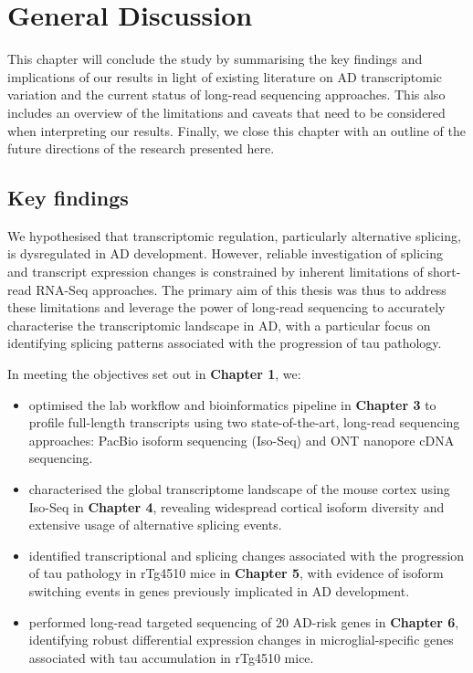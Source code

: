 \chapter{General Discussion}

This chapter will conclude the study by summarising the key findings and implications of our results in light of existing literature on AD transcriptomic variation and the current status of long-read sequencing approaches. This also includes an overview of the limitations and caveats that need to be considered when interpreting our results. Finally, we close this chapter with an outline of the future directions of the research presented here.       

\section{Key findings}
We hypothesised that transcriptomic regulation, particularly alternative splicing, is dysregulated in AD development. However, reliable investigation of splicing and transcript expression changes is constrained by inherent limitations of short-read RNA-Seq approaches. The primary aim of this thesis was thus to address these limitations and leverage the power of long-read sequencing to accurately characterise the transcriptomic landscape in AD, with a particular focus on identifying splicing patterns associated with the progression of tau pathology.

In meeting the objectives set out in \textbf{Chapter 1}, we:
\begin{itemize}
	\item optimised the lab workflow and bioinformatics pipeline in \textbf{Chapter 3} to profile full-length transcripts using two state-of-the-art, long-read sequencing approaches: PacBio isoform sequencing (Iso-Seq) and ONT nanopore cDNA sequencing.  
	
	\item characterised the global transcriptome landscape of the mouse cortex using Iso-Seq in \textbf{Chapter 4}, revealing widespread cortical isoform diversity and extensive usage of alternative splicing events. 
	
	\item identified transcriptional and splicing changes associated with the progression of tau pathology in rTg4510 mice in \textbf{Chapter 5}, with evidence of isoform switching events in genes previously implicated in AD development. 
	
	\item performed long-read targeted sequencing of 20 AD-risk genes in \textbf{Chapter 6}, identifying robust differential expression changes in microglial-specific genes associated with tau accumulation in rTg4510 mice.    
\end{itemize}

